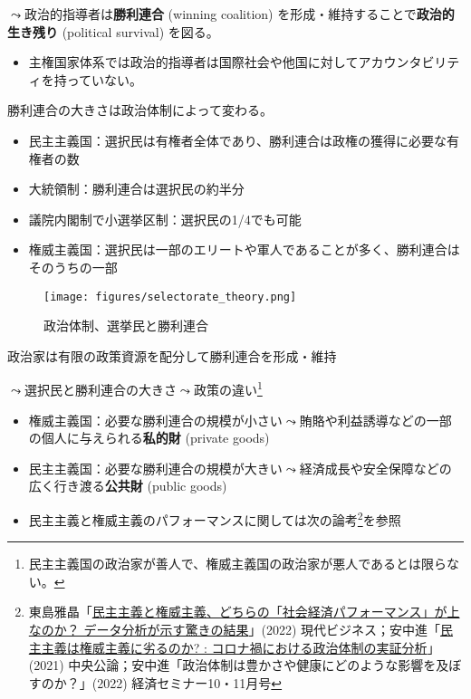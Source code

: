 \documentclass[
  xelatex,
  ja=standard]{bxjsarticle}
\providecommand{\tightlist}{%
  \setlength{\itemsep}{0pt}\setlength{\parskip}{0pt}}\usepackage{longtable,booktabs,array}
\begin{document}
\(\leadsto\)政治的指導者は\textbf{勝利連合} (winning coalition)
を形成・維持することで\textbf{政治的生き残り} (political survival)
を図る\citetext{\citealp[第9章]{asako2018}; \citealp{buenodemesquita2013}}。

\begin{itemize}
\tightlist
\item
  主権国家体系では政治的指導者は国際社会や他国に対してアカウンタビリティを持っていない。
\end{itemize}

勝利連合の大きさは政治体制によって変わる。

\begin{itemize}
\tightlist
\item
  民主主義国：選択民は有権者全体であり、勝利連合は政権の獲得に必要な有権者の数
\item
  大統領制：勝利連合は選択民の約半分
\item
  議院内閣制で小選挙区制：選択民の1/4でも可能
\item
  権威主義国：選択民は一部のエリートや軍人であることが多く、勝利連合はそのうちの一部
\end{itemize}

\begin{figure}[htpb]

{\centering \texttt{[image: figures/selectorate\_theory.png]}

}

\caption{政治体制、選挙民と勝利連合}

\end{figure}

政治家は有限の政策資源を配分して勝利連合を形成・維持

\(\leadsto\)選択民と勝利連合の大きさ\(\leadsto\)政策の違い\footnote{民主主義国の政治家が善人で、権威主義国の政治家が悪人であるとは限らない。}

\begin{itemize}
\tightlist
\item
  権威主義国：必要な勝利連合の規模が小さい\(\leadsto\)賄賂や利益誘導などの一部の個人に与えられる\textbf{私的財}
  (private goods)
\item
  民主主義国：必要な勝利連合の規模が大きい\(\leadsto\)経済成長や安全保障などの広く行き渡る\textbf{公共財}
  (public goods)
\item
  民主主義と権威主義のパフォーマンスに関しては次の論考\footnote{東島雅晶「\href{https://gendai.media/articles/-/91203}{民主主義と権威主義、どちらの「社会経済パフォーマンス」が上なのか？
    データ分析が示す驚きの結果}」(2022)
    現代ビジネス；安中進「\href{https://chuokoron.jp/politics/117870.html}{民主主義は権威主義に劣るのか?
    : コロナ禍における政治体制の実証分析}」(2021)
    中央公論；安中進「政治体制は豊かさや健康にどのような影響を及ぼすのか？」(2022)
    経済セミナー10・11月号}を参照
\end{itemize}
\end{document}
